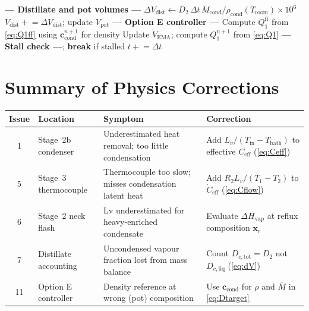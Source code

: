 \documentclass[11pt,letterpaper]{article}
\newcommand{\dt}{\Delta t}
\begin{document}
\begin{algorithm}[H]
\begin{algorithmic}[1]
  \State \textbf{--- Distillate and pot volumes ---}
  \State $\Delta V_{\mathrm{dist}} \leftarrow \bar{D}_2\,\dt\,\bar{M}_{\mathrm{cond}} / \rho_{\mathrm{cond}}(T_{\mathrm{room}}) \times 10^6$ \hfill{}
  \State $V_{\mathrm{dist}} \mathrel{+}= \Delta V_{\mathrm{dist}}$; \quad update $V_{\mathrm{pot}}$
  \State \textbf{--- Option E controller ---}
  \State Compute $Q_1^{\mathrm{ff}}$ from \cref{eq:Q1ff} using $\mathbf{c}_{\mathrm{cond}}^{n+1}$ for density \hfill{}
  \State Update $\dot{V}_{\mathrm{EMA}}$; compute $Q_1^{n+1}$ from \cref{eq:Q1}
  \State \textbf{--- Stall check ---}; \textbf{break} if stalled \hfill{}
  \State $t \mathrel{+}= \dt$
\EndWhile
\end{algorithmic}
\end{algorithm}

\section{Summary of Physics Corrections}
\label{sec:fixes}

\begin{center}
\renewcommand{\arraystretch}{1.4}
\begin{tabular}{cllp{5cm}}
\toprule
Issue & Location & Symptom & Correction \\
\midrule
1 & Stage~2b condenser & Underestimated heat removal; too little condensation & Add $L_v/(T_{\mathrm{in}}{-}T_{\mathrm{bath}})$ to effective $C_{\mathrm{eff}}$ (\cref{eq:Ceff}) \\
5 & Stage~3 thermocouple & Thermocouple too slow; misses condensation latent heat & Add $R_2 L_v/(T_1{-}T_2)$ to $\dot{C}_{\mathrm{eff}}$ (\cref{eq:Cflow}) \\
6 & Stage~2 neck flash & Lv underestimated for heavy-enriched condensate & Evaluate $\Delta H_{\mathrm{vap}}$ at reflux composition $\mathbf{x}_r$ \\
7 & Distillate accounting & Uncondensed vapour fraction lost from mass balance & Count $D_{c,\mathrm{tot}} = D_2$ not $D_{c,\mathrm{liq}}$ (\cref{eq:dV}) \\
11 & Option E controller & Density reference at wrong (pot) composition & Use $\mathbf{c}_{\mathrm{cond}}$ for $\rho$ and $\bar{M}$ in \cref{eq:Dtarget} \\
\bottomrule
\end{tabular}
\end{center}
\end{document}
